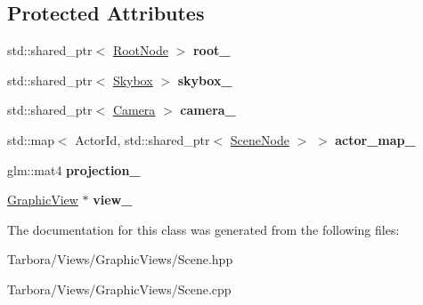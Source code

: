 \subsection*{Protected Attributes}
\begin{DoxyCompactItemize}
\item 
\mbox{\label{classTarbora_1_1Scene_ae76617d855f3ef6b95412bdad93c5f89}} 
std\+::shared\+\_\+ptr$<$ \hyperlink{classTarbora_1_1RootNode}{Root\+Node} $>$ {\bfseries root\+\_\+}
\item 
\mbox{\label{classTarbora_1_1Scene_ab687079dca1351a5698ae5ce34832376}} 
std\+::shared\+\_\+ptr$<$ \hyperlink{classTarbora_1_1Skybox}{Skybox} $>$ {\bfseries skybox\+\_\+}
\item 
\mbox{\label{classTarbora_1_1Scene_af69e7fd6e7afa3ae20a195e0a25ef3b7}} 
std\+::shared\+\_\+ptr$<$ \hyperlink{classTarbora_1_1Camera}{Camera} $>$ {\bfseries camera\+\_\+}
\item 
\mbox{\label{classTarbora_1_1Scene_a0d1a30a13a228211dafe95f6d8bfb6d0}} 
std\+::map$<$ Actor\+Id, std\+::shared\+\_\+ptr$<$ \hyperlink{classTarbora_1_1SceneNode}{Scene\+Node} $>$ $>$ {\bfseries actor\+\_\+map\+\_\+}
\item 
\mbox{\label{classTarbora_1_1Scene_a24f2d6838057adb5e3c99f69663ea832}} 
glm\+::mat4 {\bfseries projection\+\_\+}
\item 
\mbox{\label{classTarbora_1_1Scene_a8fc51d6ff67ffa8c9e1e0a3fc55c68bf}} 
\hyperlink{classTarbora_1_1GraphicView}{Graphic\+View} $\ast$ {\bfseries view\+\_\+}
\end{DoxyCompactItemize}


The documentation for this class was generated from the following files\+:\begin{DoxyCompactItemize}
\item 
Tarbora/\+Views/\+Graphic\+Views/Scene.\+hpp\item 
Tarbora/\+Views/\+Graphic\+Views/Scene.\+cpp\end{DoxyCompactItemize}
